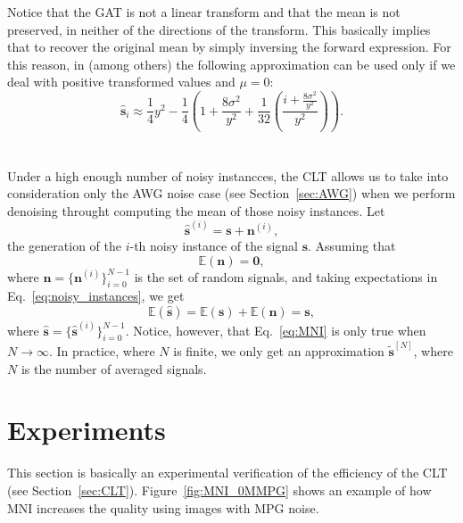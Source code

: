 Notice that the \gls{GAT} is not a linear transform and that the mean is
not preserved, in neither of the directions of the transform. This
basically implies that to recover the original mean by simply
inversing the forward expression. For this reason, in
\cite{makitalo2012optimal} (among others) the following approximation
can be used only if we deal with positive transformed values and $\mu=0$:
\begin{equation}
  \hat{\mathbf{s}}_i \approx \frac{1}{4}y^2-\frac{1}{4}\left(1+\frac{8\sigma^2}{y^2} + \frac{1}{32}\left(\frac{i+\frac{8\sigma^2}{y^2}}{y^2}\right)\right).
\end{equation}

\section{}
Under a high enough number of noisy instancces, the \gls{CLT} allows
us to take into consideration only the \gls{AWG} noise case (see
Section~\ref{sec:AWG}) when we perform denoising throught computing
the mean of those noisy instances. Let
\begin{equation}
  \hat{\mathbf{s}}^{(i)} = \mathbf{s} + \mathbf{n}^{(i)},
  \label{eq:noisy_instances}
\end{equation}
the generation of the $i$-th noisy instance of the
signal $\mathbf{s}$. Assuming that
\begin{equation}
  \mathbb{E}(\mathbf{n})=\mathbf{0},
\end{equation}
where $\mathbf{n}=\{\mathbf{n}^{(i)}\}_{i=0}^{N-1}$ is the set of
random signals, and taking expectations in
Eq.~\ref{eq:noisy_instances}, we get
\begin{equation}
  \mathbb{E}(\hat{\mathbf{s}}) = \mathbb{E}(\mathbf{s}) + \mathbb{E}(\mathbf{n}) = \mathbf{s},
  \label{eq:MNI}
\end{equation}
where
$\hat{\mathbf{s}}=\{\hat{\mathbf{s}}^{(i)}\}_{i=0}^{N-1}$. Notice,
however, that Eq.~\ref{eq:MNI} is only true when
$N\rightarrow\infty$. In practice, where $N$ is finite, we only get an
approximation $\tilde{\mathbf{s}}^{[N]}$, where $N$ is the number of
averaged signals.

\section{Experiments}

This section is basically an experimental verification of the
efficiency of the \gls{CLT} (see
Section~\ref{sec:CLT}). Figure~\ref{fig:MNI_0MMPG} shows an example of
how \gls{MNI} increases the quality using images with \gls{MPG} noise.
  

